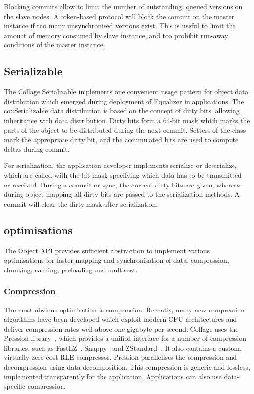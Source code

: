 Blocking commits allow to limit the number of outstanding, queued versions on
the slave nodes. A token-based protocol will block the commit on the master
instance if too many unsynchronised versions exist. This is useful to limit the
amount of memory consumed by slave instance, and too prohibit run-away
conditions of the master instance.

\subsection{Serializable}

\label{sec:Serializable}The \textsf{Collage} Serializable implements one
convenient usage pattern for object data distribution which emerged during
deployment of Equalizer in applications. The \textsf{co::Serializable} data
distribution is based on the concept of dirty bits, allowing inheritance with
data distribution. Dirty bits form a 64-bit mask which marks the parts of the
object to be distributed during the next commit. Setters of the class mark the
appropriate dirty bit, and the accumulated bits are used to compute deltas
during commit.

For serialization, the application developer implements \textsf{serialize} or
\textsf{deserialize}, which are called with the bit mask specifying which data
has to be transmitted or received. During a commit or sync, the current dirty
bits are given, whereas during object mapping all dirty bits are passed to the
serialization methods. A commit will clear the dirty mask after serialization.


\subsection{optimisations}

The Object API provides sufficient abstraction to implement various
optimisations for faster mapping and synchronisation of data: compression,
chunking, caching, preloading and multicast.

\subsubsection{Compression}

The most obvious optimisation is compression. Recently, many new compression
algorithms have been developed which exploit modern CPU architectures and
deliver compression rates well above one gigabyte per second. \textsf{Collage}
uses the Pression library~\cite{pression}, which provides a unified interface
for a number of compression libraries, such as FastLZ~\cite{jesperfast},
Snappy~\cite{snappy} and ZStandard~\cite{zstd}. It also contains a custom,
virtually zero-cost RLE compressor. Pression parallelises the compression and
decompression using data decomposition. This compression is generic and
lossless, implemented transparently for the application. Applications can also
use data-specific compression.

